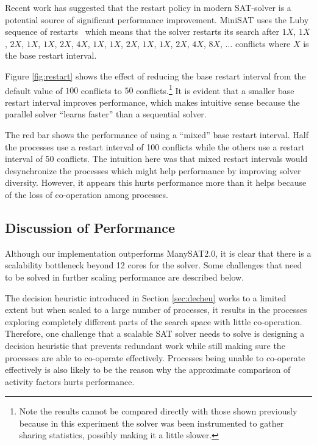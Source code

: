 \documentclass[letterpaper, compsoc, conference]{IEEEtran}
\begin{document}
Recent work \cite{HuangRestart2007} has suggested that the restart policy in
modern SAT-solver is a potential source of significant performance improvement.
MiniSAT uses the Luby sequence of restarts~\cite{Luby93optimalspeedup}
which means that the solver restarts its search after $1X$, $1X$, $2X$, $1X$, $1X$,
$2X$, $4X$, $1X$, $1X$, $2X$, $1X$, $1X$, $2X$, $4X$, $8X$, $\dots$ conflicts
where $X$ is the base restart interval. 

Figure \ref{fig:restart} shows the effect of reducing the base restart interval
from the default value of $100$ conflicts to $50$ conflicts.\footnote{Note the
results cannot be compared directly with those shown previously because in this
experiment the solver was been instrumented to gather sharing statistics,
possibly making it a little slower.} It is evident that a smaller base restart
interval improves performance, which makes intuitive sense because the parallel
solver ``learns faster'' than a sequential solver. 

The red bar shows the performance of using a ``mixed'' base restart interval.
Half the processes use a restart interval of 100 conflicts while the others use a
restart interval of 50 conflicts. The intuition here was that mixed restart
intervals would desynchronize the processes which might help performance by
improving solver diversity. However, it appears this hurts performance more
than it helps because of the loss of co-operation among processes.

\subsection{Discussion of Performance}
\label{sec:disc}

Although our implementation outperforms ManySAT2.0, it is clear that there is
a scalability bottleneck beyond 12 cores for the solver.  Some challenges
that need to be solved in further scaling performance are described below.

The decision heuristic introduced in Section \ref{sec:decheu} works to a
limited extent but when scaled to a large number of processes, it results in
the processes exploring completely different parts of the search space with
little co-operation. Therefore, one challenge that a scalable SAT solver needs
to solve is designing a decision heuristic that prevents redundant work while
still making sure the processes are able to co-operate effectively.  Processes
being unable to co-operate effectively is also likely to be the reason why the
approximate comparison of activity factors hurts performance.
\end{document}
